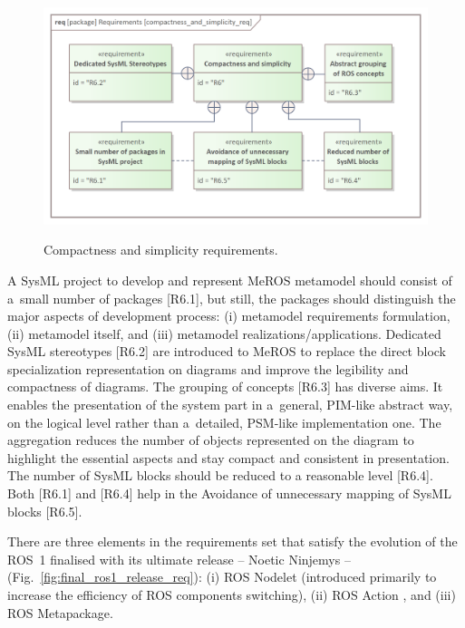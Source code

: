 \begin{figure}[H]
	\centering
	\begin{center}
	{\includegraphics[scale=0.9]{../imgs/requirement_pkg/compactness_and_simplicity_req.png}}
	\end{center}
	\caption{Compactness and simplicity requirements.}
	\label{fig:compactness_and_simplicity_req}
\end{figure}

A SysML project to develop and represent MeROS metamodel should consist of a~small number of packages [R6.1], but still, the packages should distinguish the major aspects of development process: (i) metamodel requirements formulation, (ii) metamodel itself, and (iii) metamodel realizations/applications.
Dedicated SysML stereotypes [R6.2] are introduced to MeROS to replace the direct block specialization representation on diagrams and improve the legibility and compactness of diagrams.
The grouping of concepts [R6.3] has diverse aims. It enables the presentation of the system part in a~general, PIM-like abstract way, on the logical level rather than a~detailed, PSM-like implementation one. The aggregation reduces the number of objects represented on the diagram to highlight the essential aspects and stay compact and consistent in presentation.
The number of SysML blocks should be reduced to a reasonable level [R6.4]. Both [R6.1] and [R6.4] help in the Avoidance of unnecessary mapping of SysML blocks [R6.5].

There are three elements in the requirements set that satisfy the evolution of the ROS~1  finalised with its ultimate release -- Noetic Ninjemys -- (Fig.~\ref{fig:final_ros1_release_req}): (i) ROS Nodelet  (introduced primarily to increase the efficiency of ROS components switching), (ii) ROS Action , and (iii) ROS Metapackage.


